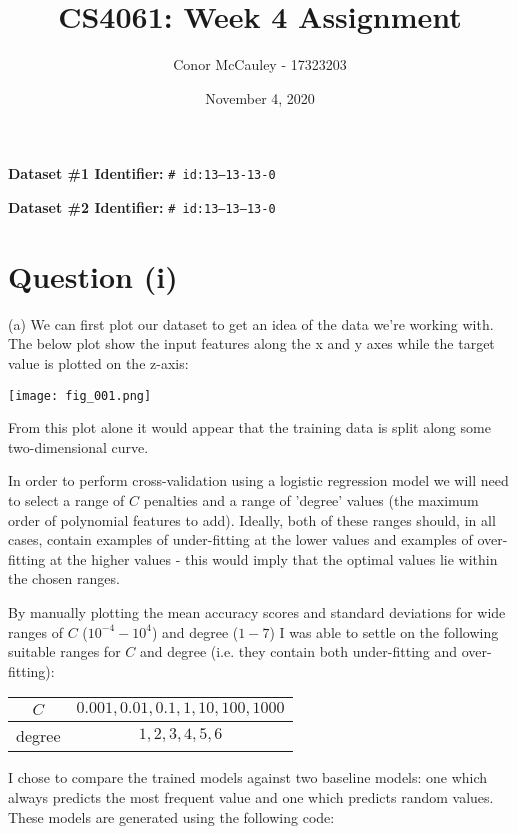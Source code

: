 \documentclass[12pt]{article}
\title{CS4061: Week 4 Assignment}
\author{Conor McCauley - 17323203}
\date{November 4, 2020}
\begin{document}
\maketitle

\noindent \textbf{Dataset \#1 Identifier:} \texttt{\# id:13--13-13-0}

\noindent \textbf{Dataset \#2 Identifier:} \texttt{\# id:13--13--13-0}

\section*{Question (i)}

\noindent (a) We can first plot our dataset to get an idea of the data we're working with. The below plot show the input features along the x and y axes while the target value is plotted on the z-axis:

\begin{center}
    \texttt{[image: fig\_001.png]}
\end{center}

From this plot alone it would appear that the training data is split along some two-dimensional curve.

In order to perform cross-validation using a logistic regression model we will need to select a range of $C$ penalties and a range of 'degree' values (the maximum order of polynomial features to add). Ideally, both of these ranges should, in all cases, contain examples of under-fitting at the lower values and examples of over-fitting at the higher values - this would imply that the optimal values lie within the chosen ranges.

By manually plotting the mean accuracy scores and standard deviations for wide ranges of $C$ ($10^{-4} - 10^{4}$) and degree ($1 - 7$) I was able to settle on the following suitable ranges for $C$ and degree (i.e. they contain both under-fitting and over-fitting):

\begin{center}
    \begin{tabular}{|c|c|}
        \hline
        $C$ &  $0.001, 0.01, 0.1, 1, 10, 100, 1000$ \\ \hline
        degree & $1, 2, 3, 4, 5, 6$ \\ \hline
    \end{tabular}
\end{center}

I chose to compare the trained models against two baseline models: one which always predicts the most frequent value and one which predicts random values. These models are generated using the following code:
\end{document}
